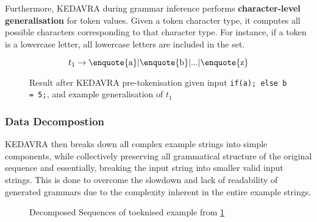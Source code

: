 Furthermore, KEDAVRA during grammar inference performs \textbf{character-level generalisation} for token values. Given a token character type,  it computes all possible characters corresponding to that character type. For instance, if a token is a lowercase letter, all lowercase letters are included in the set.

\begin{figure}[H]
\centering
{}

\[
t_1 \rightarrow \text{\enquote{a}}|\text{\enquote{b}}|...|\text{\enquote{z}}
\]

\caption{Result after KEDAVRA pre-tokenisation given input \texttt{if(a); else b = 5;}, and example generalisation of $t_1$}
\label{fig:pre-tokenised KEDAVRA}
\end{figure}

\subsubsection{Data Decompostion}

KEDAVRA then breaks down all complex example strings into simple components, while collectively preserving all grammatical structure of the original sequence and essentially, breaking the input string into smaller valid input strings. This is done to overcome the slowdown and lack of readability of generated grammars due to the complexity inherent in the entire example strings.

\begin{figure}[h!]
\centering
{}
\caption{Decomposed Sequences of toeknised example from \ref{fig:pre-tokenised KEDAVRA}}
\label{fig:decomp KEDAVRA}
\end{figure}

